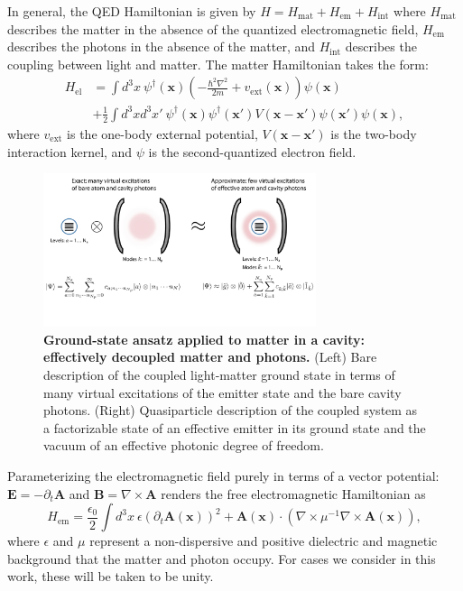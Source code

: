 \documentclass[aps,prl,twocolumn,
	groupedaddress,superscriptaddress,
	amsfonts,amssymb,amsmath,floatfix,
	citeautoscript]{revtex4-1}
\newcommand{\Jadd}[1]{\textcolor{blue}{#1}}
\begin{document}
In general, the QED Hamiltonian is given by $H = H_{\mathrm{mat}}+H_{\mathrm{em}}+H_{\mathrm{int}}$ where $H_{\mathrm{mat}}$ describes the matter in the absence of the quantized electromagnetic field, $H_{\mathrm{em}}$ describes the photons in the absence of the matter, and $H_{\mathrm{int}}$ describes the coupling between light and matter. The matter Hamiltonian takes the form:
\begin{align}
H_{\mathrm{el}} &= \int d^3x ~\psi^{\dagger}(\mathbf{x})\left(-\frac{\hbar^2\nabla^2}{2m} + v_{\mathrm{ext}}(\mathbf{x}) \right)\psi(\mathbf{x}) \nonumber \\ &+ \frac{1}{2}\int d^3x d^3x'~ \psi^{\dagger}(\mathbf{x})\psi^{\dagger}(\mathbf{x}')V(\mathbf{x}-\mathbf{x}')\psi(\mathbf{x}')\psi(\mathbf{x}),
\end{align}
where $v_{\mathrm{ext}}$ is the one-body external potential, $V(\mathbf{x}-\mathbf{x}')$ is the two-body interaction kernel, and $\psi$ is the second-quantized electron field. %
\begin{figure}[t]
\includegraphics[width=8cm]{conceptfigure.pdf}
\caption{\textbf{Ground-state ansatz applied to matter in a cavity: effectively decoupled matter and photons.} (Left) Bare description of the coupled light-matter ground state in terms of many virtual excitations of the emitter state and the bare cavity photons. (Right) Quasiparticle description of the coupled system as a factorizable state of an effective emitter in its ground state and the vacuum of an effective photonic degree of freedom.}
\label{fig:ansatz}
\end{figure}
Parameterizing the electromagnetic field purely in terms of a vector potential: $\mathbf{E} = -\partial_t\mathbf{A}$ and $\mathbf{B} = \nabla\times\mathbf{A}$ renders the free electromagnetic Hamiltonian as
\begin{equation}
H_{\mathrm{em}} = \frac{\epsilon_0}{2}\int d^3x~ \epsilon (\partial_t \mathbf{A}(\mathbf{x}))^2 + \mathbf{A}(\mathbf{x})\cdot(\nabla\times\mu^{-1}\nabla\times\mathbf{A}(\mathbf{x})),
\end{equation}
where $\epsilon$ and $\mu$ represent a non-dispersive and positive dielectric and magnetic background that the matter and photon occupy. For cases we consider in this work, these will be taken to be unity.
\end{document}

